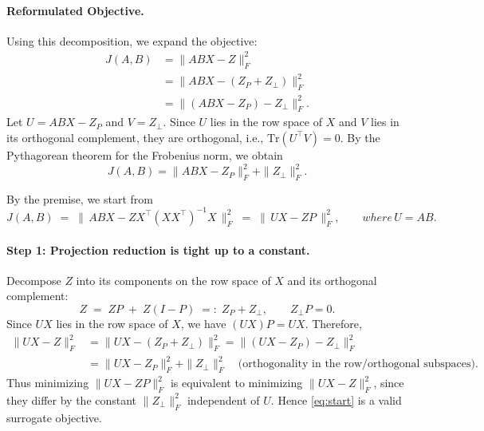 \paragraph{Reformulated Objective.}
Using this decomposition, we expand the objective:
    \begin{equation}
\begin{aligned}
   J(A,B) &= \|ABX - Z\|_F^2 \\
          &= \|ABX - (Z_P + Z_\perp)\|_F^2 \\
          &= \|(ABX - Z_P) - Z_\perp\|_F^2.
\end{aligned}
\end{equation}
Let $U = ABX - Z_P$ and $V = Z_\perp$. Since $U$ lies in the row space of $X$ and $V$ lies in its orthogonal complement, they are orthogonal, i.e., $\mathrm{Tr}(U^\top V) = 0$. By the Pythagorean theorem for the Frobenius norm, we obtain
\begin{equation}
   J(A,B) = \|ABX - Z_P\|_F^2 + \|Z_\perp\|_F^2.
   \label{eq jab}
\end{equation}

By the premise, we start from
\begin{equation}
J(A,B) \;=\; \|\,ABX - ZX^\top(XX^\top)^{-1}X\,\|_F^2 \;=\; \|\,U X - ZP\,\|_F^2,
\qquad where\, U=AB .
\label{eq:start}
\end{equation}

\paragraph{Step 1: Projection reduction is tight up to a constant.}
Decompose $Z$ into its components on the row space of $X$ and its orthogonal complement:
\begin{equation}
Z \;=\; ZP \;+\; Z(I-P) \;=:\; Z_P + Z_\perp,
\qquad Z_\perp P = 0 .
\end{equation}
Since $UX$ lies in the row space of $X$, we have $(UX)P=UX$. Therefore,
\begin{align}
\|UX - Z\|_F^2
&= \|UX - (Z_P + Z_\perp)\|_F^2
= \|(UX - Z_P) - Z_\perp\|_F^2 \nonumber\\
&= \|UX - Z_P\|_F^2 + \|Z_\perp\|_F^2 
\quad\text{(orthogonality in the row/orthogonal subspaces).}
\label{eq:pyth}
\end{align}
Thus minimizing $\|UX - ZP\|_F^2$ is equivalent to minimizing $\|UX - Z\|_F^2$, since they differ by the constant $\|Z_\perp\|_F^2$ independent of $U$. Hence \eqref{eq:start} is a valid surrogate objective.

